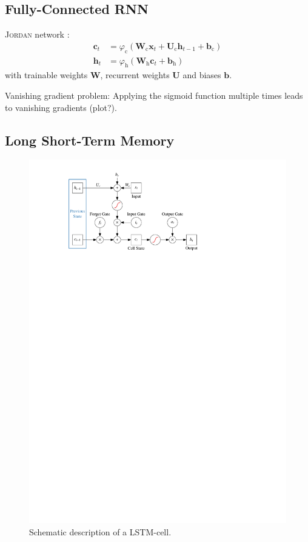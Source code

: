 \subsection{Fully-Connected RNN}
\label{sec:fully_connected_rnn}

\textsc{Jordan} network :
\begin{align*}
  \mathbf{c}_t &= \varphi_{\text{c}}\left( \mathbf{W}_{\text{c}} \mathbf{x}_{t} + \mathbf{U}_{\text{c}} \mathbf{h}_{t-1} + \mathbf{b}_{\text{c}} \right) \\
  \mathbf{h}_t &= \varphi_{\text{h}}\left( \mathbf{W}_{\text{h}} \mathbf{c}_{t} + \mathbf{b}_{\text{h}} \right)
\end{align*}
with trainable weights $\mathbf{W}$, recurrent weights $\mathbf{U}$ and biases $\mathbf{b}$.

Vanishing gradient problem: Applying the sigmoid function multiple times leads
to vanishing gradients (plot?).

\subsection{Long Short-Term Memory}
\label{sec:lstm}

\begin{figure}[t]
  \centering
  \includegraphics{./figures/theory/LSTM.pdf}
  \caption{Schematic description of a LSTM-cell.}
  \label{fig:schematic_lstm}
\end{figure}

